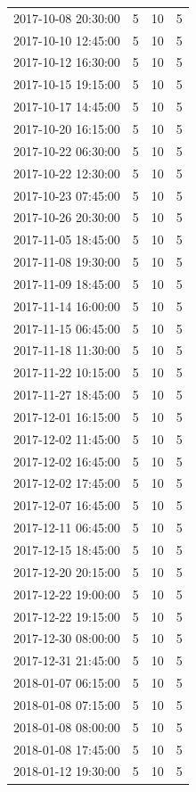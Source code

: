 \begin{tabular}{lrrr}
2017-10-08 20:30:00 & 5 & 10 & 5 \\
2017-10-10 12:45:00 & 5 & 10 & 5 \\
2017-10-12 16:30:00 & 5 & 10 & 5 \\
2017-10-15 19:15:00 & 5 & 10 & 5 \\
2017-10-17 14:45:00 & 5 & 10 & 5 \\
2017-10-20 16:15:00 & 5 & 10 & 5 \\
2017-10-22 06:30:00 & 5 & 10 & 5 \\
2017-10-22 12:30:00 & 5 & 10 & 5 \\
2017-10-23 07:45:00 & 5 & 10 & 5 \\
2017-10-26 20:30:00 & 5 & 10 & 5 \\
2017-11-05 18:45:00 & 5 & 10 & 5 \\
2017-11-08 19:30:00 & 5 & 10 & 5 \\
2017-11-09 18:45:00 & 5 & 10 & 5 \\
2017-11-14 16:00:00 & 5 & 10 & 5 \\
2017-11-15 06:45:00 & 5 & 10 & 5 \\
2017-11-18 11:30:00 & 5 & 10 & 5 \\
2017-11-22 10:15:00 & 5 & 10 & 5 \\
2017-11-27 18:45:00 & 5 & 10 & 5 \\
2017-12-01 16:15:00 & 5 & 10 & 5 \\
2017-12-02 11:45:00 & 5 & 10 & 5 \\
2017-12-02 16:45:00 & 5 & 10 & 5 \\
2017-12-02 17:45:00 & 5 & 10 & 5 \\
2017-12-07 16:45:00 & 5 & 10 & 5 \\
2017-12-11 06:45:00 & 5 & 10 & 5 \\
2017-12-15 18:45:00 & 5 & 10 & 5 \\
2017-12-20 20:15:00 & 5 & 10 & 5 \\
2017-12-22 19:00:00 & 5 & 10 & 5 \\
2017-12-22 19:15:00 & 5 & 10 & 5 \\
2017-12-30 08:00:00 & 5 & 10 & 5 \\
2017-12-31 21:45:00 & 5 & 10 & 5 \\
2018-01-07 06:15:00 & 5 & 10 & 5 \\
2018-01-08 07:15:00 & 5 & 10 & 5 \\
2018-01-08 08:00:00 & 5 & 10 & 5 \\
2018-01-08 17:45:00 & 5 & 10 & 5 \\
2018-01-12 19:30:00 & 5 & 10 & 5 \\

\end{tabular}
